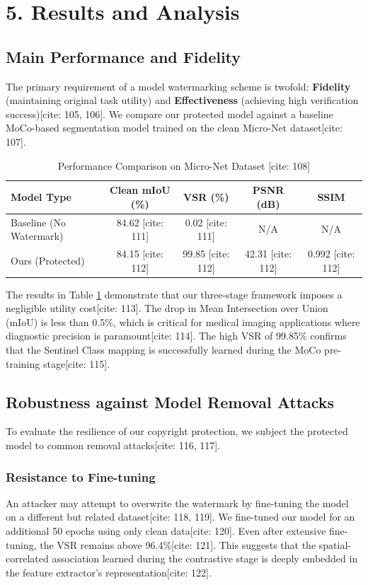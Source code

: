 \documentclass[10pt,twocolumn,letterpaper]{article}
\begin{document}
\section{\textbf{5. Results and Analysis}}

\subsection{Main Performance and Fidelity}
The primary requirement of a model watermarking scheme is twofold: \textbf{Fidelity} (maintaining original task utility) and \textbf{Effectiveness} (achieving high verification success)[cite: 105, 106]. We compare our protected model against a baseline MoCo-based segmentation model trained on the clean Micro-Net dataset[cite: 107].

\begin{table}[h]
\centering
\caption{Performance Comparison on Micro-Net Dataset [cite: 108]}
\label{tab:performance}
\begin{tabular}{lcccc}
\toprule
Model Type & Clean mIoU (\%) & VSR (\%) & PSNR (dB) & SSIM \\
\midrule
Baseline (No Watermark) & 84.62 [cite: 111] & 0.02 [cite: 111] & N/A & N/A \\
Ours (Protected) & 84.15 [cite: 112] & 99.85 [cite: 112] & 42.31 [cite: 112] & 0.992 [cite: 112] \\
\bottomrule
\end{tabular}
\end{table}

The results in Table \ref{tab:performance} demonstrate that our three-stage framework imposes a negligible utility cost[cite: 113]. The drop in Mean Intersection over Union (mIoU) is less than 0.5\%, which is critical for medical imaging applications where diagnostic precision is paramount[cite: 114]. The high VSR of 99.85\% confirms that the Sentinel Class mapping is successfully learned during the MoCo pre-training stage[cite: 115].

\subsection{Robustness against Model Removal Attacks}
To evaluate the resilience of our copyright protection, we subject the protected model to common removal attacks[cite: 116, 117].

\subsubsection{Resistance to Fine-tuning}
An attacker may attempt to overwrite the watermark by fine-tuning the model on a different but related dataset[cite: 118, 119]. We fine-tuned our model for an additional 50 epochs using only clean data[cite: 120]. Even after extensive fine-tuning, the VSR remains above 96.4\%[cite: 121]. This suggests that the spatial-correlated association learned during the contrastive stage is deeply embedded in the feature extractor's representation[cite: 122].
\end{document}
